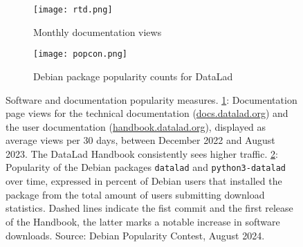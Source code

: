 

\begin{figure}
	\begin{subfigure}{.48\textwidth}
		\texttt{[image: rtd.png]}
		\caption{Monthly documentation views}
		\label{fig:rtd}
	\end{subfigure}
	\begin{subfigure}{.48\textwidth}
		\texttt{[image: popcon.png]}
		\caption{Debian package popularity counts for DataLad}
		\label{fig:popcon}
	\end{subfigure}
	\caption[Software and documentation popularity]{Software and documentation popularity measures. \ref{fig:rtd}: Documentation page views for the technical documentation (\url{docs.datalad.org}) and the user documentation (\url{handbook.datalad.org}), displayed as average views per 30 days, between December 2022 and August 2023. The DataLad Handbook consistently sees higher traffic.
		\ref{fig:popcon}: Popularity of the Debian packages \texttt{datalad} and \texttt{python3-datalad} over time, expressed in percent of Debian users that installed the package from the total amount of users submitting download statistics. Dashed lines indicate the fist commit and the first release of the Handbook, the latter marks a notable increase in software downloads. Source: Debian Popularity Contest, August 2024.}
	\label{fig:popularity}
\end{figure}

\pagebreak

